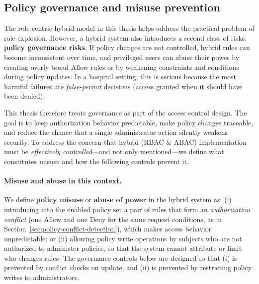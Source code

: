 \subsection{Policy governance and misuse prevention}
\label{sec:policy-governance}

The role-centric hybrid model in this thesis helps address the practical problem of role explosion. However, a hybrid system also introduces a second class of risks: \textbf{policy governance risks}. If policy changes are not controlled, hybrid rules can become inconsistent over time, and privileged users can abuse their power by creating overly broad Allow rules or by weakening constraints and conditions during policy updates. In a hospital setting, this is serious because the most harmful failures are \emph{false-permit} decisions (access granted when it should have been denied).
\vspace{0.5cm}

This thesis therefore treats governance as part of the access control design. The goal is to keep authorization behavior predictable, make policy changes traceable, and reduce the chance that a single administrator action silently weakens security. To address the concern that hybrid (RBAC \& ABAC) implementation must be \emph{effectively controlled}---and not only mentioned---we define what constitutes misuse and how the following controls prevent it.
\vspace{0.5cm}

\paragraph{Misuse and abuse in this context.}
We define \textbf{policy misuse} or \textbf{abuse of power} in the hybrid system as: (i) introducing into the enabled policy set a pair of rules that form an \emph{authorization conflict} (one Allow and one Deny for the same request conditions, as in Section~\ref{sec:policy-conflict-detection}), which makes access behavior unpredictable; or (ii) allowing policy write operations by subjects who are not authorized to administer policies, so that the system cannot attribute or limit who changes rules. The governance controls below are designed so that (i) is prevented by conflict checks on update, and (ii) is prevented by restricting policy writes to administrators.
\vspace{0.5cm}

